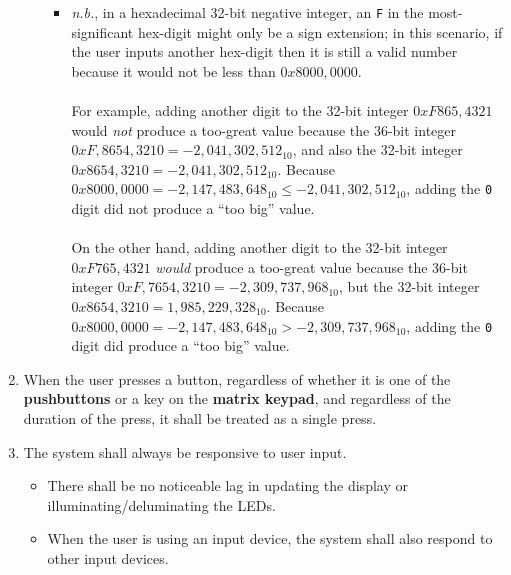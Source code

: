 \begin{enumerate}
\begin{enumerate}
\begin{itemize}
            \item \textit{n.b.}, in a hexadecimal 32-bit negative integer, an \texttt{F} in the most-significant hex-digit might only be a sign extension;
                in this scenario, if the user inputs another hex-digit then it is still a valid number because it would not be less than $0x8000,0000$. \\ \\
                For example, adding another digit to the 32-bit integer $0xF865,4321$ would \textit{not} produce a too-great value because the 36-bit integer $0xF,8654,3210 = -2,041,302,512_{10}$, and also the 32-bit integer $0x8654,3210 = -2,041,302,512_{10}$.
                Because $0x8000,0000 = -2,147,483,648_{10} \leq -2,041,302,512_{10}$, adding the \texttt{0} digit did not produce a ``too big'' value. \\ \\
                On the other hand, adding another digit to the 32-bit integer $0xF765,4321$ \textit{would} produce a too-great value because the 36-bit integer $0xF,7654,3210 = -2,309,737,968_{10}$, but the 32-bit integer $0x8654,3210 = 1,985,229,328_{10}$.
                Because $0x8000,0000 = -2,147,483,648_{10} > -2,309,737,968_{10}$, adding the \texttt{0} digit did produce a ``too big'' value.
            \end{itemize}
        \end{enumerate}
    \item \label{spec:singleKeypress} When the user presses a button, regardless of whether it is one of the \textbf{pushbuttons} or a key on the \textbf{matrix keypad}, and regardless of the duration of the press, it shall be treated as a single press.
    \item \label{spec:responsive} The system shall always be responsive to user input.
        \begin{itemize}
            \item There shall be no noticeable lag in updating the display or illuminating/deluminating the LEDs.
            \item When the user is using an input device, the system shall also respond to other input devices.
                \begin{itemize}

\end{itemize}
\end{itemize}
\end{enumerate}
